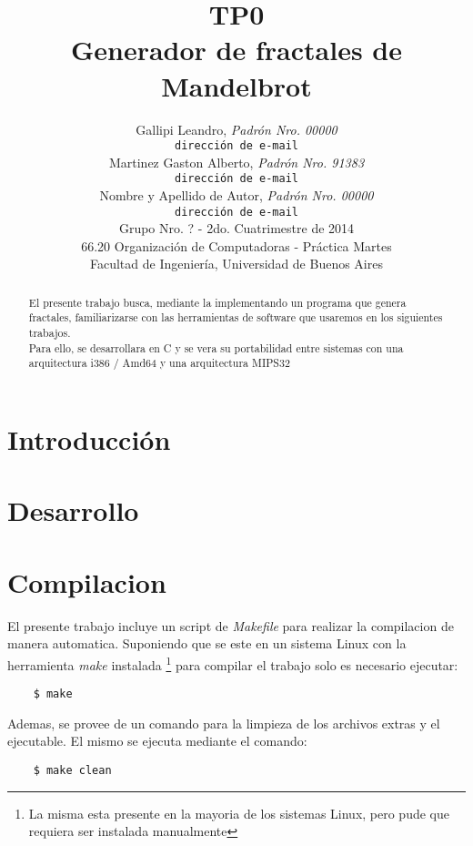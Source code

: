 \documentclass[10pt,spanish,a4paper,openany,notitlepage]{article}
\title{\textbf{TP0}\\ Generador de fractales de Mandelbrot}
\author{Gallipi Leandro, \textit{Padrón Nro. 00000}                    \\
            \texttt{ dirección de e-mail }                                              			\\
            Martinez Gaston Alberto, \textit{Padrón Nro. 91383}                     	\\
            \texttt{ dirección de e-mail }                                            			\\
            Nombre y Apellido de Autor, \textit{Padrón Nro. 00000}                     	\\
            \texttt{ dirección de e-mail }                                              			\\[2.5ex]
            \normalsize{Grupo Nro. ? - 2do. Cuatrimestre de 2014}                       	\\
            \normalsize{66.20 Organización de Computadoras - Práctica Martes}  	\\
            \normalsize{Facultad de Ingeniería, Universidad de Buenos Aires}     	\\
       }
\date{}
\begin{document}
\setcounter{page}{0} %

\maketitle

\thispagestyle{empty}

\begin{abstract}
El presente trabajo busca, mediante la implementando un programa que genera fractales, familiarizarse con las herramientas de software que usaremos en los siguientes trabajos.\\
Para ello, se desarrollara en C y se vera su portabilidad entre sistemas con una arquitectura i386 / Amd64 y una arquitectura MIPS32
\end{abstract}
 
\newpage

\section{Introducción}

\section{Desarrollo}

\section{Compilacion}

El presente trabajo incluye un script de \textit{Makefile} para realizar la compilacion de manera automatica. Suponiendo que se este en un sistema Linux con la herramienta \textit{make} instalada \footnote{La misma esta presente en la mayoria de los sistemas Linux, pero pude que requiera ser instalada manualmente} para compilar el trabajo solo es necesario ejecutar:

\begin{framed}
\begin{verbatim}    $ make\end{verbatim}
\end{framed}

Ademas, se provee de un comando para la limpieza de los archivos extras y el ejecutable. El mismo se ejecuta mediante el comando:

\begin{framed}
\begin{verbatim}    $ make clean\end{verbatim}
\end{framed}
\end{document}
